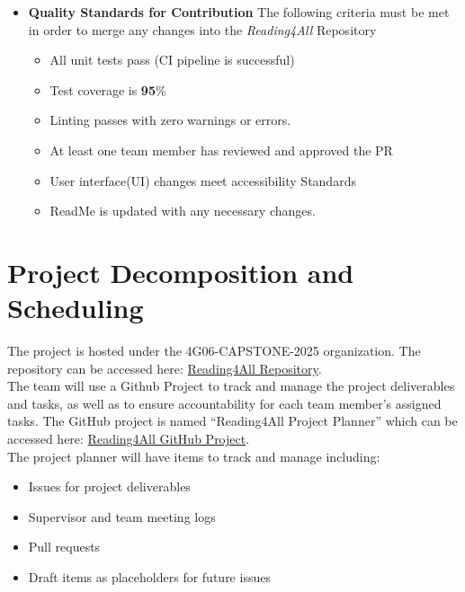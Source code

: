 \documentclass{article}
\begin{document}
\begin{itemize}
\begin{itemize}
  \end{itemize}
  \item \textbf{Quality Standards for Contribution}\newline
  The following criteria must be met in order to merge any changes into the \textit{Reading4All} Repository
  \begin{itemize}
    \item All unit tests pass (CI pipeline is successful)
    \item Test coverage is \textbf{95}\%
    \item Linting passes with zero warnings or errors. 
    \item At least one team member has reviewed and approved the PR
    \item User interface(UI) changes meet accessibility Standards
    \item ReadMe is updated with any necessary changes. 
  \end{itemize}
  
  \end{itemize}

\section{Project Decomposition and Scheduling}

The project is hosted under the 4G06-CAPSTONE-2025 organization. The repository can be 
accessed here: \href{https://github.com/4G06-CAPSTONE-2025/Reading4All}{Reading4All Repository}. \\[1ex]
The team will use a Github Project to track and manage the project deliverables and tasks, as well 
as to ensure accountability for each team member's assigned tasks. The GitHub 
project is named ``Reading4All Project Planner'' which can be accessed here: 
\href{https://github.com/orgs/4G06-CAPSTONE-2025/projects/4}{Reading4All GitHub Project}. \\[1ex]
The project planner will have items to track and manage including:
\begin{itemize}
  \item Issues for project deliverables
  \item Supervisor and team meeting logs 
  \item Pull requests 
  \item Draft items as placeholders for future issues
\end{itemize}
\end{document}
